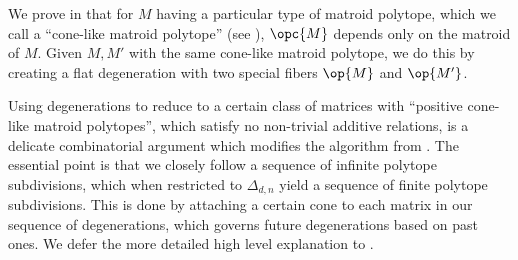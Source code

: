 \documentclass[12pt]{amsart}
\theoremstyle{plain}
\theoremstyle{definition}
\theoremstyle{remark}
\begin{document}
 We prove in  that for $M$ having a particular type of matroid polytope, which we call a ``cone-like matroid polytope'' (see ), $\opc{M}$ depends only on the matroid of $M$. Given $M,M'$ with the same cone-like matroid polytope, we do this by creating a flat degeneration with two special fibers $\op{M}$ and $\op{M'}$.

Using degenerations to reduce to a certain class of matrices with ``positive cone-like matroid polytopes'', which satisfy no non-trivial additive relations, is a delicate combinatorial argument which modifies the algorithm from \cite[Appendix A]{Derksen}. The essential point is that we closely follow a sequence of infinite polytope subdivisions, which when restricted to $\Delta_{d,n}$ yield a sequence of finite polytope subdivisions. This is done by attaching a certain cone to each matrix in our sequence of degenerations, which governs future degenerations based on past ones. We defer the more detailed high level explanation to .
\end{document}

